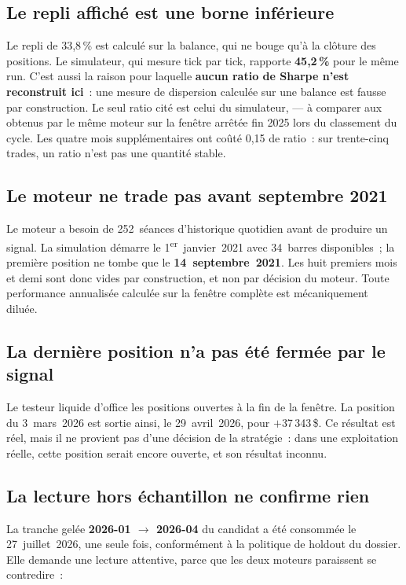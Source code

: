 \subsection*{Le repli affiché est une borne inférieure}

Le repli de 33,8\,\% est calculé sur la balance, qui ne bouge qu'à la clôture
des positions. Le simulateur, qui mesure tick par tick, rapporte
\textbf{45,2\,\%} pour le même run. C'est aussi la raison pour laquelle
\textbf{aucun ratio de Sharpe n'est reconstruit ici}~: une mesure de dispersion
calculée sur une balance est fausse par construction. Le seul ratio cité est
celui du simulateur,  --- à comparer aux  obtenus par
le même moteur sur la fenêtre arrêtée fin 2025 lors du classement du cycle. Les
quatre mois supplémentaires ont coûté 0,15 de ratio~: sur trente-cinq trades,
un ratio n'est pas une quantité stable.

\subsection*{Le moteur ne trade pas avant septembre 2021}

Le moteur a besoin de 252~séances d'historique quotidien avant de produire un
signal. La simulation démarre le 1\textsuperscript{er}~janvier~2021 avec
34~barres disponibles~; la première position ne tombe que le
\textbf{14~septembre~2021}. Les huit premiers mois et demi sont donc vides par
construction, et non par décision du moteur. Toute performance annualisée
calculée sur la fenêtre complète est mécaniquement diluée.

\subsection*{La dernière position n'a pas été fermée par le signal}

Le testeur liquide d'office les positions ouvertes à la fin de la fenêtre. La
position du 3~mars~2026 est sortie ainsi, le 29~avril~2026, pour
$+$37\,343\,\$. Ce résultat est réel, mais il ne provient pas d'une décision de
la stratégie~: dans une exploitation réelle, cette position serait encore
ouverte, et son résultat inconnu.

\subsection*{La lecture hors échantillon ne confirme rien}

La tranche gelée \textbf{2026-01 $\to$ 2026-04} du candidat a été consommée le
27~juillet~2026, une seule fois, conformément à la politique de holdout du
dossier. Elle demande une lecture attentive, parce que les deux moteurs
paraissent se contredire~:

